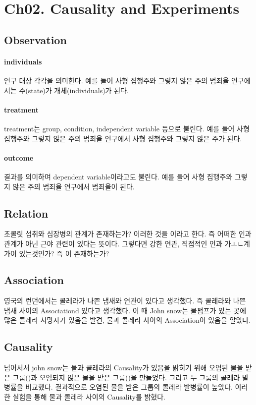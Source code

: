 \documentclass[../Data_Science.tex]{subfiles}
\begin{document}
\section{Ch02. Causality and Experiments}\label{sec:Ch02. Causality and Experiments}
\subsection{Observation}\label{subsec:Observation}
\paragraph{individuals}\label{paragraph:individuals}
연구 대상 각각을 의미한다. 예를 들어 사형 집행주와 그렇지 않은 주의 범죄율 연구에서는 주(state)가 개체(individuals)가 된다.

\paragraph{treatment}\label{paragraph:treatment}
treatment는 group, condition, independent variable 등으로 불린다. 예를 들어 사형 집행주와 그렇지 않은 주의 범죄율 연구에서 사형 집행주와 그렇지 않은 주가 된다.

\paragraph{outcome}\label{paragraph:outcome}
결과를 의미하며 dependent variable이라고도 불린다. 예를 들어 사형 집행주와 그렇지 않은 주의 범죄율 연구에서 범죄율이 된다.

\subsection{Relation}\label{subsec:Relation}
초콜릿 섭취와 심장병의 관계가 존재하는가? 이러한 것을 이라고 한다. 즉 어떠한 인과관계가 아닌 근야 관련이 있다는 뜻이다. 그렇다면 강한 연관, 직접적인 인과 가ㅗㄴ계가이 있는것인가? 즉 이 존재하는가?

\subsection{Association}\label{subsec:Association}
영국의 런던에서는 콜레라가 나쁜 냄새와 연관이 있다고 생각했다. 즉 콜레라와 나쁜 냄새 사이의 Associationd 있다고 생각했다.
이 때 John snow는 물펌프가 있는 곳에 많은 콜레라 사망자가 있음을 발견, 물과 콜레라 사이의 Association이 있음을 알았다.

\subsection{Causality}\label{subsec:Causality}
넘어서서 john snow는 물과 콜레라의 Causality가 있음을 밝히기 위해 오염된 물을 받은 그룹()과 오염되지 않은 물을 받은 그룹()을 만들었다. 그리고 두 그룹의 콜레라 발병률을 비교했다. 결과적으로 오염된 물을 받은 그룹의 콜레라 발병률이 높았다. 이러한 실험을 통해 물과 콜레라 사이의 Causality를 밝혔다.
\end{document}
